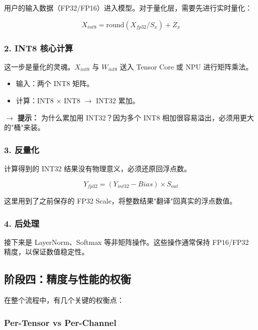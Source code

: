 \documentclass[fontset=fandol,11pt,a4paper]{ctexart}
\newcommand{\codeinline}[1]{\texttt{\color{Primary!80}#1}}
\begin{document}
用户的输入数据（FP32/FP16）进入模型。对于量化层，需要先进行实时量化：

\begin{mathbox}
\[
X_{int8} = \text{round}(X_{fp32} / S_x) + Z_x
\]
\end{mathbox}

\subsubsection{2. INT8 核心计算}

这一步是量化的灵魂。\codeinline{$X_{int8}$} 与 \codeinline{$W_{int8}$} 送入 Tensor Core 或 NPU 进行矩阵乘法。

\begin{itemize}
  \item 输入：两个 INT8 矩阵。
  \item 计算：INT8 $\times$ INT8 $\rightarrow$ INT32 累加。
\end{itemize}

\begin{tipbox}
\textbf{$\rightarrow$ 提示：} 为什么累加用 INT32？因为多个 INT8 相加很容易溢出，必须用更大的"桶"来装。
\end{tipbox}

\subsubsection{3. 反量化}

计算得到的 INT32 结果没有物理意义，必须还原回浮点数。

\begin{mathbox}
\[
Y_{fp32} = (Y_{int32} - Bias) \times S_{out}
\]
\end{mathbox}

这里用到了之前保存的 FP32 Scale，将整数结果"翻译"回真实的浮点数值。

\subsubsection{4. 后处理}

接下来是 LayerNorm、Softmax 等非矩阵操作。这些操作通常保持 FP16/FP32 精度，以保证数值稳定性。

\subsection{阶段四：精度与性能的权衡}

在整个流程中，有几个关键的权衡点：

\subsubsection{Per-Tensor vs Per-Channel}
\end{document}
